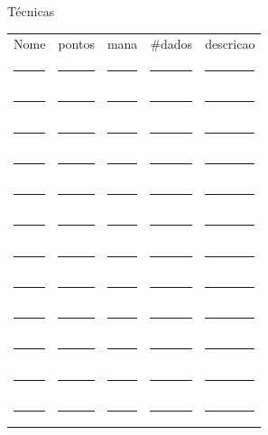 \documentclass[a4paper,12pt]{article}
\begin{document}
	\begin{minipage}{\linewidth}
		{\centering Técnicas \vspace{.3cm}\\}
		\begin{tabularx}{\linewidth}{ p{.2\linewidth} p{.08\linewidth} p{.06\linewidth} p{.08\linewidth} p{.5\linewidth}}
			Nome & pontos & mana & \#dados & descricao \\
			\rule{\linewidth}{.5pt} & \rule{\linewidth}{.5pt} & \rule{\linewidth}{.5pt} & \rule{\linewidth}{.5pt} & \rule{.94\linewidth}{.5pt} \\
			\rule{\linewidth}{.5pt} & \rule{\linewidth}{.5pt} & \rule{\linewidth}{.5pt} & \rule{\linewidth}{.5pt} & \rule{.94\linewidth}{.5pt} \\
			\rule{\linewidth}{.5pt} & \rule{\linewidth}{.5pt} & \rule{\linewidth}{.5pt} & \rule{\linewidth}{.5pt} & \rule{.94\linewidth}{.5pt} \\
			\rule{\linewidth}{.5pt} & \rule{\linewidth}{.5pt} & \rule{\linewidth}{.5pt} & \rule{\linewidth}{.5pt} & \rule{.94\linewidth}{.5pt} \\
			\rule{\linewidth}{.5pt} & \rule{\linewidth}{.5pt} & \rule{\linewidth}{.5pt} & \rule{\linewidth}{.5pt} & \rule{.94\linewidth}{.5pt} \\
			\rule{\linewidth}{.5pt} & \rule{\linewidth}{.5pt} & \rule{\linewidth}{.5pt} & \rule{\linewidth}{.5pt} & \rule{.94\linewidth}{.5pt} \\
			\rule{\linewidth}{.5pt} & \rule{\linewidth}{.5pt} & \rule{\linewidth}{.5pt} & \rule{\linewidth}{.5pt} & \rule{.94\linewidth}{.5pt} \\
			\rule{\linewidth}{.5pt} & \rule{\linewidth}{.5pt} & \rule{\linewidth}{.5pt} & \rule{\linewidth}{.5pt} & \rule{.94\linewidth}{.5pt} \\
			\rule{\linewidth}{.5pt} & \rule{\linewidth}{.5pt} & \rule{\linewidth}{.5pt} & \rule{\linewidth}{.5pt} & \rule{.94\linewidth}{.5pt} \\
			\rule{\linewidth}{.5pt} & \rule{\linewidth}{.5pt} & \rule{\linewidth}{.5pt} & \rule{\linewidth}{.5pt} & \rule{.94\linewidth}{.5pt} \\
			\rule{\linewidth}{.5pt} & \rule{\linewidth}{.5pt} & \rule{\linewidth}{.5pt} & \rule{\linewidth}{.5pt} & \rule{.94\linewidth}{.5pt} \\
			\rule{\linewidth}{.5pt} & \rule{\linewidth}{.5pt} & \rule{\linewidth}{.5pt} & \rule{\linewidth}{.5pt} & \rule{.94\linewidth}{.5pt} \\
		\end{tabularx}
	\end{minipage}\vspace{.3cm}\\
	
\end{document}
